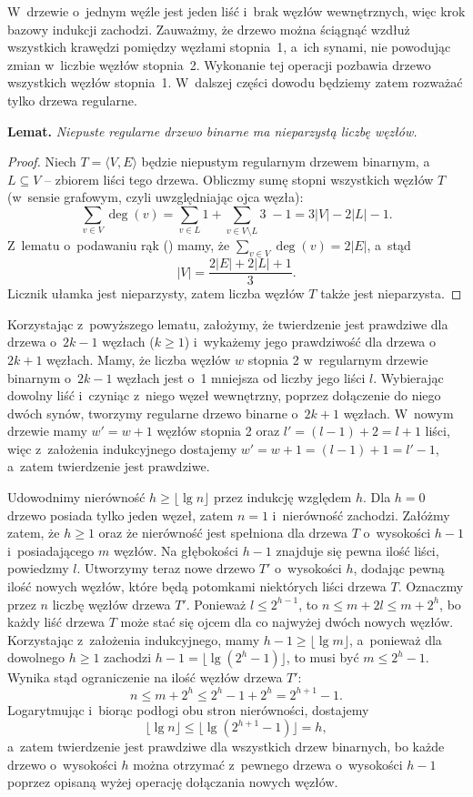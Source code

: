 \exercise %
W~drzewie o~jednym węźle jest jeden liść i~brak węzłów wewnętrznych, więc krok bazowy indukcji zachodzi. Zauważmy, że drzewo można ściągnąć wzdłuż wszystkich krawędzi pomiędzy węzłami stopnia~1, a~ich synami, nie powodując zmian w~liczbie węzłów stopnia~2. Wykonanie tej operacji pozbawia drzewo wszystkich węzłów stopnia~1. W~dalszej części dowodu będziemy zatem rozważać tylko drzewa regularne.

\medskip
\noindent\textsf{\textbf{Lemat.}} \textit{Niepuste regularne drzewo binarne ma nieparzystą liczbę węzłów.}
\begin{proof}
Niech $T=\langle V,E\rangle$ będzie niepustym regularnym drzewem binarnym, a~$L\subseteq V$ -- zbiorem liści tego drzewa. Obliczmy sumę stopni wszystkich węzłów $T$ (w~sensie grafowym, czyli uwzględniając ojca węzła):
\[
	\sum_{v\in V}\deg(v) = \sum_{v\in L}1+\sum_{v\in V\setminus L}\!\!\!3\;-1=3|V|-2|L|-1.
\]
Z~lematu o~podawaniu rąk () mamy, że $\sum_{v\in V}\deg(v) = 2|E|$, a~stąd
\[
	|V| = \frac{2|E|+2|L|+1}{3}.
\]
Licznik ułamka jest nieparzysty, zatem liczba węzłów $T$ także jest nieparzysta.
\end{proof}

Korzystając z~powyższego lematu, założymy, że twierdzenie jest prawdziwe dla drzewa o~$2k-1$ węzłach ($k\ge1$) i~wykażemy jego prawdziwość dla drzewa o~$2k+1$ węzłach. Mamy, że liczba węzłów $w$ stopnia 2 w~regularnym drzewie binarnym o~$2k-1$ węzłach jest o~1 mniejsza od liczby jego liści $l$. Wybierając dowolny liść i~czyniąc z~niego węzeł wewnętrzny, poprzez dołączenie do niego dwóch synów, tworzymy regularne drzewo binarne o~$2k+1$ węzłach. W~nowym drzewie mamy $w'=w+1$ węzłów stopnia 2 oraz $l'=(l-1)+2=l+1$ liści, więc z~założenia indukcyjnego dostajemy $w'=w+1=(l-1)+1=l'-1$, a~zatem twierdzenie jest prawdziwe.

\exercise %
Udowodnimy nierówność $h\ge\lfloor\lg n\rfloor$ przez indukcję względem $h$. Dla $h=0$ drzewo posiada tylko jeden węzeł, zatem $n=1$ i~nierówność zachodzi. Załóżmy zatem, że $h\ge1$ oraz że nierówność jest spełniona dla drzewa $T$ o~wysokości $h-1$ i~posiadającego $m$ węzłów. Na głębokości $h-1$ znajduje się pewna ilość liści, powiedzmy $l$. Utworzymy teraz nowe drzewo $T'$ o~wysokości $h$, dodając pewną ilość nowych węzłów, które będą potomkami niektórych liści drzewa $T$. Oznaczmy przez $n$ liczbę węzłów drzewa $T'$. Ponieważ $l\le2^{h-1}$, to $n\le m+2l\le m+2^h$, bo każdy liść drzewa $T$ może stać się ojcem dla co najwyżej dwóch nowych węzłów. Korzystając z~założenia indukcyjnego, mamy $h-1\ge\lfloor\lg m\rfloor$, a~ponieważ dla dowolnego $h\ge1$ zachodzi $h-1=\bigl\lfloor\lg(2^h-1)\bigr\rfloor$, to musi być $m\le 2^h-1$. Wynika stąd ograniczenie na ilość węzłów drzewa $T'$:
\[
	n \le m+2^h \le 2^h-1+2^h = 2^{h+1}-1.
\]
Logarytmując i~biorąc podłogi obu stron nierówności, dostajemy
\[
	\lfloor\lg n\rfloor \le \bigl\lfloor\lg(2^{h+1}-1)\bigr\rfloor = h,
\]
a~zatem twierdzenie jest prawdziwe dla wszystkich drzew binarnych, bo każde drzewo o~wysokości $h$ można otrzymać z~pewnego drzewa o~wysokości $h-1$ poprzez opisaną wyżej operację dołączania nowych węzłów.

